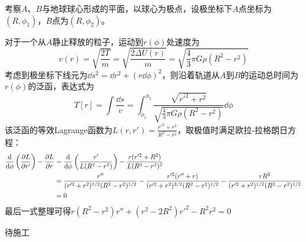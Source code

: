 \begin{solution}
    考察\(A\)、\(B\)与地球球心形成的平面，以球心为极点，设极坐标下\(A\)点坐标为\( (R,\phi_1) \)，\(B\)点为\( (R,\phi_2) \)。

    对于一个从\(A\)静止释放的粒子，运动到\( r(\phi) \)处速度为
    \[
    \begin{equation}
        v(r) = \sqrt{\frac{2T}{m}} = \sqrt{\frac{2\Delta U(r)}{m}} = \sqrt{\frac43 \pi G \rho (R^2-r^2)}
    \end{equation}
    \]
    考虑到极坐标下线元为\( \dd s^2 = \dd r^2 + (r\dd \phi)^2 \)，则沿着轨道从\(A\)到\(B\)的运动总时间为\( r(\phi) \)的泛函，表达式为
    \[
    \begin{equation}
        T[r] = \int \frac{\dd s}{v}
             = \int_{\phi_1}^{\phi_2} \frac{ \sqrt{r'^2+r^2} }{ \sqrt{\frac43 \pi G \rho (R^2-r^2)} }\dd \phi
    \end{equation}
    \]
    该泛函的等效Lagrange函数为\( L(r,r')= \frac{r'^2+r^2}{R^2-r^2} \)，取极值时满足欧拉-拉格朗日方程：
    \[
    \begin{aligned}
        \frac{\dd}{\dd \phi} \left( \frac{\partial L}{\partial r'} \right) - \frac{\partial L}{\partial r}
        & = \frac{\dd}{\dd \phi} \left( \frac{r'}{L(R^2-r^2)} \right) - \frac{r(r'^2+R^2)}{L(R^2-r^2)^2} \\
        & = \frac{r''}{(r'^2+r^2)^{1/2}(R^2-r^2)^{1/2}} - 
            \frac{r'^2(r''+r)}{(r'^2+r^2)^{3/2}(R^2-r^2)^{1/2}} - 
            \frac{rR^2}{(r'^2+r^2)^{1/2}(R^2-r^2)^{1/2}} \\
        & = 0
    \end{aligned}
    \]
    最后一式整理可得\( r(R^2-r^2)r''+(r^2-2R^2)r'^2-R^2r^2 = 0 \)
\end{solution}

\begin{solution}
    待施工
\end{solution}

